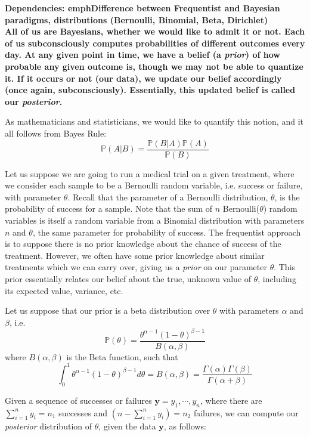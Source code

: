 \bf{Dependencies:} emph{Difference between Frequentist and Bayesian paradigms, distributions (Bernoulli, Binomial, Beta, Dirichlet)}\\

All of us are Bayesians, whether we would like to admit it or not. Each of us subconsciously computes probabilities of different outcomes every day. At any given point in time, we have a belief (a \emph{prior}) of how probable any given outcome is, though we may not be able to quantize it. If it occurs or not (our data), we update our belief accordingly (once again, subconsciously). Essentially, this updated belief is called our \emph{posterior}.

As mathematicians and statisticians, we would like to quantify this notion, and it all follows from Bayes Rule:
\begin{equation*}
\mathbb{P}(A | B) = \frac{\mathbb{P}(B | A)\mathbb{P}(A)}{\mathbb{P}(B)}
\end{equation*}

Let us suppose we are going to run a medical trial on a given treatment, where we consider each sample to be a Bernoulli random variable, i.e. success or failure, with parameter $\theta$. Recall that the parameter of a Bernoulli distribution, $\theta$, is the probability of success for a sample.  Note that the sum of $n$ Bernoulli($\theta$) random variables is itself a random variable from a Binomial distribution with parameters $n$ and $\theta$, the same parameter for probability of success. The frequentist approach is to suppose there is no prior knowledge about the chance of success of the treatment. However, we often have some prior knowledge about similar treatments which we can carry over, giving us a \emph{prior} on our parameter $\theta$. This prior essentially relates our belief about the true, unknown value of $\theta$, including its expected value, variance, etc.

Let us suppose that our prior is a beta distribution over $\theta$ with parameters $\alpha$ and $\beta$, i.e. $$\mathbb{P}(\theta) = \frac{\theta^{\alpha - 1}(1 - \theta)^{\beta - 1}}{B(\alpha,\beta)}$$ where $B(\alpha,\beta)$ is the Beta function, such that $$\int_0^1 \theta^{\alpha - 1}(1 - \theta)^{\beta - 1} d\theta = B(\alpha,\beta) = \frac{\Gamma(\alpha)\Gamma(\beta)}{\Gamma(\alpha +\beta)}$$

 Given a sequence of successes or failures $\mathbf{y} = y_{1},\cdots,y_{n}$, where there are $\sum_{i=1}^n y_i = n_{1}$ successes and $(n - \sum_{i=1}^n y_i) = n_{2}$ failures, we can compute our \emph{posterior} distribution of $\theta$, given the data $\mathbf{y}$, as follows:

